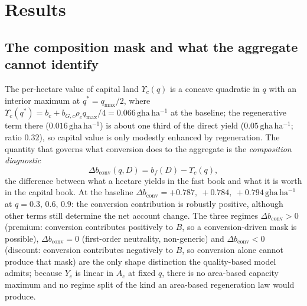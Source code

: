 \documentclass[preprint,12pt,authoryear]{elsarticle}
\newcommand{\dconv}{\Delta b_{\mathrm{conv}}}
\newcommand{\Ups}{\Upsilon_c}
\begin{document}
\section{Results}\label{sec:results}

\subsection{The composition mask and what the aggregate cannot identify}\label{sec:mask}

The per-hectare value of capital land $\Ups(q)$ is a concave quadratic in $q$ with an interior maximum at $q^*=q_{\max}/2$, where $\Ups(q^*)=b_c+b_{G,c}\rho_c q_{\max}/4=0.066\,\mathrm{gha\,ha^{-1}}$ at the baseline; the regenerative term there ($0.016\,\mathrm{gha\,ha^{-1}}$) is about one third of the direct yield ($0.05\,\mathrm{gha\,ha^{-1}}$; ratio $0.32$), so capital value is only modestly enhanced by regeneration. The quantity that governs what conversion does to the aggregate is the \emph{composition diagnostic}
\begin{equation}\label{eq:dconv}
\dconv(q,D)=b_f(D)-\Ups(q),
\end{equation}
the difference between what a hectare yields in the fast book and what it is worth in the capital book. At the baseline $\dconv=+0.787,\ +0.784,\ +0.794\,\mathrm{gha\,ha^{-1}}$ at $q=0.3,\,0.6,\,0.9$: the conversion contribution is robustly positive, although other terms still determine the net account change. The three regimes $\dconv>0$ (premium: conversion contributes positively to $B$, so a conversion-driven mask is possible), $\dconv=0$ (first-order neutrality, non-generic) and $\dconv<0$ (discount: conversion contributes negatively to $B$, so conversion alone cannot produce that mask) are the only shape distinction the quality-based model admits; because $Y_c$ is linear in $A_c$ at fixed $q$, there is no area-based capacity maximum and no regime split of the kind an area-based regeneration law would produce.
\end{document}
